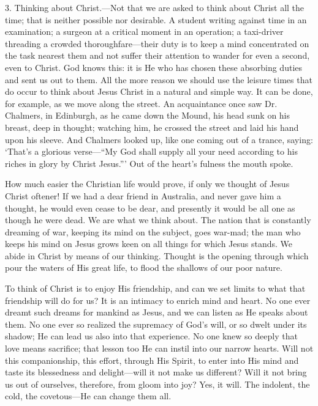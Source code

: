 \documentclass[12pt,a5paper]{article}
\begin{document}
3. Thinking about Christ.---Not that we are asked to think about Christ all the time; that is neither possible nor desirable. A student writing against time in an examination; a surgeon at a critical moment in an operation; a taxi-driver threading a crowded thoroughfare---their duty is to keep a mind concentrated on the task nearest them and not suffer their attention to wander for even a second, even to Christ. God knows this: it is He who has chosen these absorbing duties and sent us out to them. All the more reason we should use the leisure times that do occur to think about Jesus Christ in a natural and simple way. It can be done, for example, as we move along the street. An acquaintance once saw Dr. Chalmers, in Edinburgh, as he came down the Mound, his head sunk on his breast, deep in thought; watching him, he crossed the street and laid his hand upon his sleeve. And Chalmers looked up, like one coming out of a trance, saying: `That's a glorious verse---``My God shall supply all your need according to his riches in glory by Christ Jesus.''' Out of the heart's fulness the mouth spoke. 

How much easier the Christian life would prove, if only we thought of Jesus Christ oftener! If we had a dear friend in Australia, and never gave him a thought, he would even cease to be dear, and presently it would be all one as though he were dead. We are what we think about. The nation that is constantly dreaming of war, keeping its mind on the subject, goes war-mad; the man who keeps his mind on Jesus grows keen on all things for which Jesus stands. We abide in Christ by means of our thinking. Thought is the opening through which pour the waters of His great life, to flood the shallows of our poor nature.

To think of Christ is to enjoy His friendship, and can we set limits to what that friendship will do for us? It is an intimacy to enrich mind and heart. No one ever dreamt such dreams for mankind as Jesus, and we can listen as He speaks about them. No one ever so realized the supremacy of God's will, or so dwelt under its shadow; He can lead us also into that experience. No one knew so deeply that love means sacrifice; that lesson too He can instil into our narrow hearts. Will
not this companionship, this effort, through His Spirit, to enter into His mind and taste its blessedness and delight---will it not make us different? Will it not bring us out of ourselves, therefore, from gloom into joy? Yes, it will. The indolent, the cold, the covetous---He can change them all. 
\end{document}
